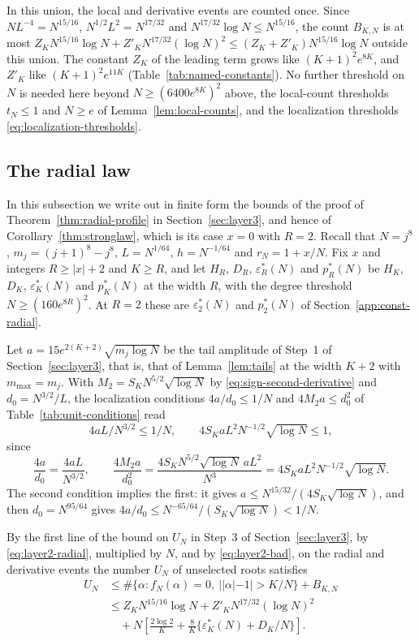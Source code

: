 In this union, the local and derivative events are counted once.
Since $NL^{-4}=N^{15/16}$, $N^{1/2}L^2=N^{17/32}$ and
$N^{17/32}\log N\le N^{15/16}$, the count $B_{K,N}$ is at most
$Z_KN^{15/16}\log N+Z'_KN^{17/32}(\log N)^2\le(Z_K+Z'_K)N^{15/16}\log N$
outside this union. The constant $Z_K$ of the leading term grows like
$(K+1)^2e^{8K}$, and $Z'_K$ like $(K+1)^2e^{11K}$
(Table~\ref{tab:named-constants}). No further threshold on $N$ is
needed here beyond $N\ge(6400e^{8K})^2$ above, the
local-count thresholds $t_N\le1$ and $N\ge e$ of
Lemma~\ref{lem:local-counts}, and the localization thresholds
\eqref{eq:localization-thresholds}.

\subsection{The radial law}\label{app:block-bounds}\label{app:const-moving-radii}
In this subsection we write out in finite form the bounds of the proof of
Theorem~\ref{thm:radial-profile} in Section~\ref{sec:layer3}, and hence
of Corollary~\ref{thm:stronglaw}, which is its case $x=0$ with $R=2$.
Recall that $N=j^8$, $m_j=(j+1)^8-j^8$, $L=N^{1/64}$, $h=N^{-1/64}$ and
$r_N=1+x/N$.
Fix $x$ and integers $R\ge|x|+2$ and $K\ge R$, and let $H_R$, $D_R$,
$\varepsilon_R^*(N)$ and $p_R^*(N)$ be $H_K$, $D_K$, $\varepsilon_K^*(N)$
and $p_K^*(N)$ at the width $R$, with the degree threshold
$N\ge(160e^{8R})^2$.
At $R=2$ these are $\varepsilon_2^*(N)$ and $p_2^*(N)$ of
Section~\ref{app:const-radial}.

Let $a=15e^{2(K+2)}\sqrt{m_j\log N}$ be the tail amplitude of Step~1 of
Section~\ref{sec:layer3}, that is, that of Lemma~\ref{lem:tails} at the
width $K+2$ with $m_{\max}=m_j$. With $M_2=S_KN^{5/2}\sqrt{\log N}$ by
\eqref{eq:sign-second-derivative} and $d_0=N^{3/2}/L$, the localization
conditions $4a/d_0\le1/N$ and $4M_2a\le d_0^2$ of
Table~\ref{tab:unit-conditions} read
\begin{equation}
 4aL/N^{3/2}\le1/N,\qquad4S_KaL^2N^{-1/2}\sqrt{\log N}\le1,
 \label{eq:localization-thresholds}
\end{equation}
since
\[
 \frac{4a}{d_0}=\frac{4aL}{N^{3/2}},\qquad
 \frac{4M_2a}{d_0^2}=\frac{4S_KN^{5/2}\sqrt{\log N}\,aL^2}{N^3}
 =4S_KaL^2N^{-1/2}\sqrt{\log N}.
\]
The second condition implies the first: it gives
$a\le N^{15/32}/(4S_K\sqrt{\log N})$, and then $d_0=N^{95/64}$ gives
$4a/d_0\le N^{-65/64}/(S_K\sqrt{\log N})<1/N$.

By the first line of the bound on $U_N$ in Step~3 of
Section~\ref{sec:layer3}, by \eqref{eq:layer2-radial}, multiplied by
$N$, and by \eqref{eq:layer2-bad}, on the radial and derivative events the
number $U_N$ of unselected roots satisfies
\begin{align}
 U_N&\le\#\{\alpha:f_N(\alpha)=0,\ ||\alpha|-1|>K/N\}+B_{K,N}\nonumber\\
 &\le Z_KN^{15/16}\log N+Z'_KN^{17/32}(\log N)^2\nonumber\\
 &\quad+N\left[\frac{2\log2}{K}+\frac8K\{\varepsilon_K^*(N)+D_K/N\}\right].
 \label{eq:block-unselected}
\end{align}

